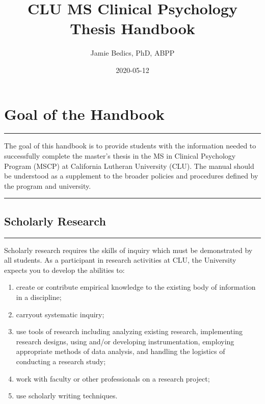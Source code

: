 \documentclass[openany]{book}
\title{CLU MS Clinical Psychology Thesis Handbook}
\author{Jamie Bedics, PhD, ABPP}
\date{2020-05-12}
\providecommand{\tightlist}{%
  \setlength{\itemsep}{0pt}\setlength{\parskip}{0pt}}
\begin{document}
\maketitle

{
\setcounter{tocdepth}{1}
\tableofcontents
}
\hypertarget{goal-of-the-handbook}{%
\chapter{Goal of the Handbook}\label{goal-of-the-handbook}}

\begin{center}\rule{0.5\linewidth}{0.5pt}\end{center}

The goal of this handbook is to provide students with the information needed to successfully complete the master's thesis in the MS in Clinical Psychology Program (MSCP) at California Lutheran University (CLU). The manual should be understood as a supplement to the broader policies and procedures defined by the program and university.

\begin{center}\rule{0.5\linewidth}{0.5pt}\end{center}

\hypertarget{scholarly-research}{%
\section{Scholarly Research}\label{scholarly-research}}

\begin{center}\rule{0.5\linewidth}{0.5pt}\end{center}

Scholarly research requires the skills of inquiry which must be demonstrated by all students. As a participant in research activities at CLU, the University expects you to develop the abilities to:

\begin{enumerate}
\def\labelenumi{\arabic{enumi}.}
\tightlist
\item
  create or contribute empirical knowledge to the existing body of information in a discipline;
\item
  carryout systematic inquiry;
\item
  use tools of research including analyzing existing research, implementing research designs, using and/or developing instrumentation, employing appropriate methods of data analysis, and handling the logistics of conducting a research study;
\item
  work with faculty or other professionals on a research project;
\item
  use scholarly writing techniques.
\end{enumerate}
\end{document}
